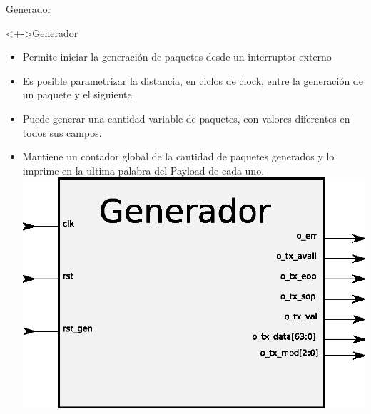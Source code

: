 \documentclass[xcolor=dvipsnames]{beamer}
\begin{document}
\begin{frame}{Generador}
  \begin{block}<+->{Generador}
	\begin{itemize}
      \scriptsize
	\item Permite iniciar la generación de paquetes desde un interruptor externo
	\item Es posible parametrizar la distancia, en ciclos de clock, entre la generación de un paquete y el siguiente.
	\item Puede generar una cantidad variable de paquetes, con valores diferentes en todos sus campos.
	\item Mantiene un contador global de la cantidad de paquetes generados y lo imprime en la ultima palabra del Payload de cada uno.
	\center
	\includegraphics[scale=0.40]{figures/bloqgenerador.eps}
	   \end{itemize}
\end{block}

\end{frame}
\end{document}
